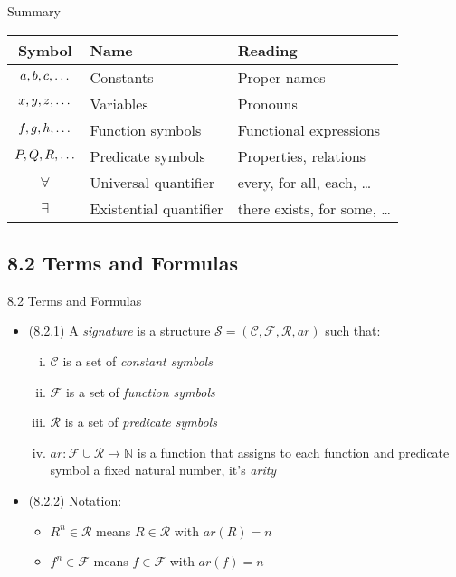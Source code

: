 \begin{frame}{Summary}

\begin{tabular}{c | l | l}
	Symbol & Name & Reading\\\hline
	$a,b,c,\mathellipsis$ & Constants & Proper names\\
	$x,y,z,\mathellipsis$ & Variables & Pronouns\\
	$f,g,h, \mathellipsis$ & Function symbols & Functional expressions\\
	$P,Q,R,\mathellipsis$ & Predicate symbols & Properties, relations\\
	$\forall $ & Universal quantifier & every, for all, each, \dots\\
	$\exists$ & Existential quantifier & there exists, for some, \dots
	\end{tabular}


\end{frame}

\subsection{8.2 Terms and Formulas}
\begin{frame}{8.2 Terms and Formulas}

	\begin{itemize}
	
		\item (8.2.1) A \emph{signature} is a structure $\mathcal{S}=(\mathcal{C}, \mathcal{F}, \mathcal{R}, ar)$ such that:
		\begin{enumerate}[(i)]
		
			\item $\mathcal{C}$ is a set of \emph{constant symbols}
			
			\item $\mathcal{F}$ is a set of \emph{function symbols}
			
			\item $\mathcal{R}$ is a set of \emph{predicate symbols}
			
			\item $ar:\mathcal{F}\cup\mathcal{R}\to\mathbb{N}$ is a function that assigns to each function and predicate symbol a fixed natural number, it's \emph{arity}
		\end{enumerate}

	\item (8.2.2) Notation:
	
		\begin{itemize}
		
			\item $R^n\in\mathcal{R}$ means $R\in\mathcal{R}$ with $ar(R)=n$
			\item $f^n\in\mathcal{F}$ means $f\in\mathcal{F}$ with $ar(f)=n$
		
		\end{itemize}
	
	\end{itemize}

\end{frame}

